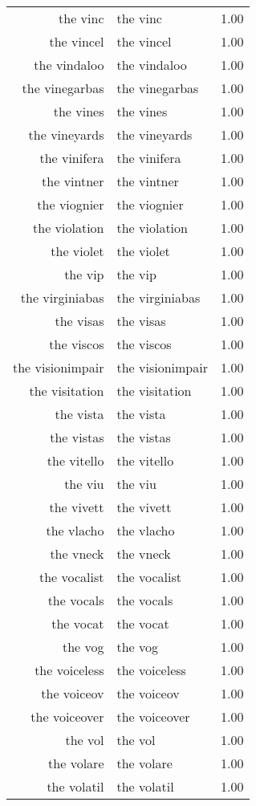 \begin{table}[ht]
\begin{tabular}{rlr}
  the vinc & the vinc & 1.00 \\ 
  the vincel & the vincel & 1.00 \\ 
  the vindaloo & the vindaloo & 1.00 \\ 
  the vinegarbas & the vinegarbas & 1.00 \\ 
  the vines & the vines & 1.00 \\ 
  the vineyards & the vineyards & 1.00 \\ 
  the vinifera & the vinifera & 1.00 \\ 
  the vintner & the vintner & 1.00 \\ 
  the viognier & the viognier & 1.00 \\ 
  the violation & the violation & 1.00 \\ 
  the violet & the violet & 1.00 \\ 
  the vip & the vip & 1.00 \\ 
  the virginiabas & the virginiabas & 1.00 \\ 
  the visas & the visas & 1.00 \\ 
  the viscos & the viscos & 1.00 \\ 
  the visionimpair & the visionimpair & 1.00 \\ 
  the visitation & the visitation & 1.00 \\ 
  the vista & the vista & 1.00 \\ 
  the vistas & the vistas & 1.00 \\ 
  the vitello & the vitello & 1.00 \\ 
  the viu & the viu & 1.00 \\ 
  the vivett & the vivett & 1.00 \\ 
  the vlacho & the vlacho & 1.00 \\ 
  the vneck & the vneck & 1.00 \\ 
  the vocalist & the vocalist & 1.00 \\ 
  the vocals & the vocals & 1.00 \\ 
  the vocat & the vocat & 1.00 \\ 
  the vog & the vog & 1.00 \\ 
  the voiceless & the voiceless & 1.00 \\ 
  the voiceov & the voiceov & 1.00 \\ 
  the voiceover & the voiceover & 1.00 \\ 
  the vol & the vol & 1.00 \\ 
  the volare & the volare & 1.00 \\ 
  the volatil & the volatil & 1.00 \\ 

\end{tabular}
\end{table}

